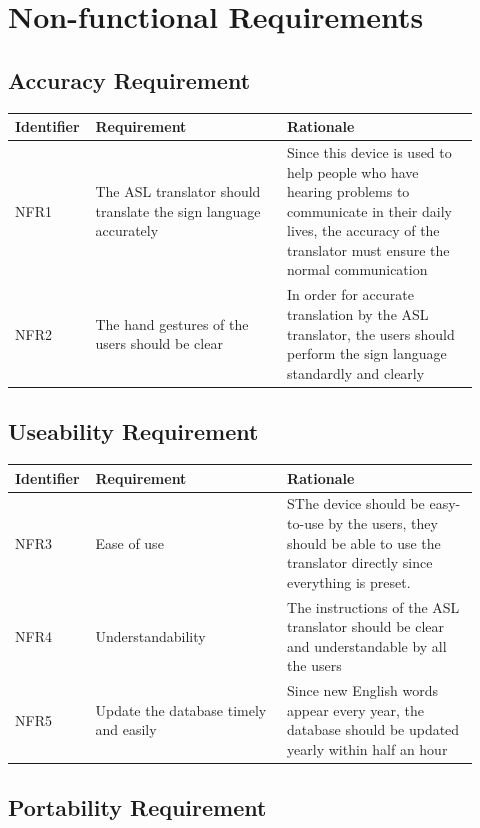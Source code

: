 \documentclass[12pt]{article}
\begin{document}
\section{Non-functional Requirements}
\subsection{Accuracy Requirement}

\renewcommand{\arraystretch}{1.2}
\noindent \begin{tabularx}{\textwidth}{p{0.12\linewidth}|p{0.4\linewidth}|p{0.4\linewidth}}
\toprule
\textbf{Identifier} & \textbf{Requirement} & \textbf{Rationale}\\
\midrule
NFR1
& The ASL translator should translate the sign language accurately 
& Since this device is used to help people who have hearing problems to communicate in their daily lives, the accuracy of the translator must ensure the normal communication\\
\hline
NFR2
&The hand gestures of the users should be clear
&In order for accurate translation by the ASL translator, the users should perform the sign language standardly and clearly\\
\bottomrule
\end{tabularx}

\subsection{Useability Requirement}

\renewcommand{\arraystretch}{1.2}
\noindent \begin{tabularx}{\textwidth}{p{0.12\linewidth}|p{0.4\linewidth}|p{0.4\linewidth}}
\toprule
\textbf{Identifier} & \textbf{Requirement} & \textbf{Rationale}\\
\midrule
NFR3
& Ease of use 
& SThe device should be easy-to-use by the users, they should be able to use the translator directly since everything is preset.\\
\hline
NFR4
& Understandability
& The instructions of the ASL translator should be clear and understandable by all the users\\
\hline
NFR5
& Update the database timely and easily
& Since new English words appear every year, the database should be updated yearly within half an hour\\
\bottomrule
\end{tabularx}

\subsection{Portability Requirement}
\end{document}
